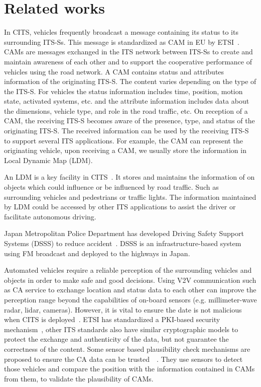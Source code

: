 \section{Related works} \label{sec:related_works}

In CITS, vehicles frequently broadcast a message containing its status to its surrounding ITS-Ss.
This message is standardized as CAM  in EU by ETSI~\cite{etsi2014302}.
CAMs are messages exchanged in the ITS network between ITS-Ss to create and maintain awareness of each other
and to support the cooperative performance of vehicles using the road network.
A CAM contains status and attributes information of the originating ITS-S.
The content varies depending on the type of the ITS-S.
For vehicles the status information includes time, position, motion state, activated systems,
etc. and the attribute information includes data about the dimensions,
vehicle type, and role in the road traffic, etc.
On reception of a CAM, the receiving ITS-S becomes aware of the presence, type, and status of the originating ITS-S.
The received information can be used by the receiving ITS-S to support several ITS applications.
For example, the CAM can represent the originating vehicle, upon receiving a CAM,
we usually store the information in Local Dynamic Map (LDM).

An LDM is a key facility in CITS~\cite{etsi2014302895}.
It stores and maintains the information of on objects which could influence or be influenced by road traffic.
Such as surrounding vehicles and pedestrians or traffic lights.
The information maintained by LDM could be accessed by other ITS applications to assist the driver or facilitate autonomous driving.

Japan Metropolitan Police Department has developed Driving Safety Support Systems (DSSS) to reduce accident~\cite{yamamoto2006aichi}.
DSSS is an infrastructure-based system using FM broadcast and deployed to the highways in Japan.

Automated vehicles require a reliable perception of the surrounding vehicles and objects in order to make safe and good decisions.
Using V2V communication such as CA service to exchange location and status data to
each other can improve the perception range beyond the capabilities of on-board sensors (e.g. millimeter-wave radar, lidar, cameras).
However, it is vital to ensure the date is not malicious when CITS is deployed~\cite{amoozadeh2015security}.
ETSI has standardized a PKI-based security mechanism~\cite{etsi2013103},
other ITS standards also have similar cryptographic models to protect the exchange and authenticity of the data,
but not guarantee the correctness of the content.
Some sensor based plausibility check mechanisms are proposed to ensure the CA data can be trusted~\cite{obst2014multi}~\cite{dhurandher2014vehicular}.
They use sensors to detect those vehicles and compare the position with the information contained in CAMs from them, to validate the plausibility of CAMs.

